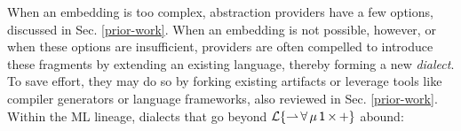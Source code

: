 \documentclass[9pt,preprint]{sigplanconf}
\begin{document}
When an embedding is too complex, abstraction providers have a few options, discussed in Sec. \ref{prior-work}. When an embedding is not possible, however, or when these options are  insufficient, providers are often compelled to introduce these fragments by extending an existing language, thereby forming a new \emph{dialect}. To save effort, they may do so by forking existing artifacts or leverage tools like compiler generators or language frameworks, also reviewed in Sec. \ref{prior-work}. %
Within the ML lineage, dialects that go  beyond $\mathcal{L}\{{\rightharpoonup}\,{\forall}\,{\mu}\,{{\sf 1}}\,{\times}\,{+}\}$ abound:
%
\end{document}
